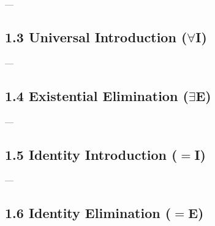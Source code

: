 \documentclass{article}
\begin{document}
---

\subsection*{1.3 Universal Introduction ($\forall$I)}
\noindent
\begin{minipage}{0.48\textwidth}
\end{minipage}

---

\subsection*{1.4 Existential Elimination ($\exists$E)}
\noindent
\begin{minipage}{0.48\textwidth}
\end{minipage}

---

\subsection*{1.5 Identity Introduction ($=$I)}
\noindent
\begin{minipage}{0.48\textwidth}
\end{minipage}

---

\subsection*{1.6 Identity Elimination ($=$E)}
\noindent
\begin{minipage}{0.48\textwidth}
\end{minipage}
\end{document}
